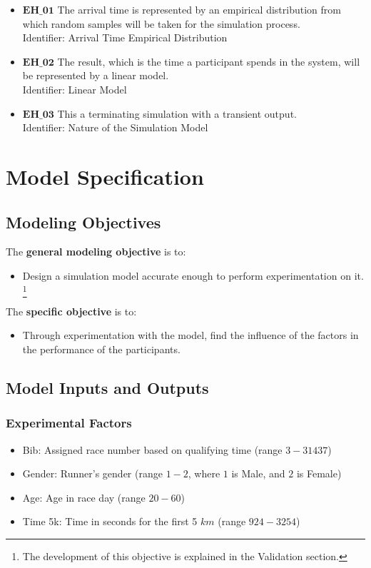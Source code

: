 \documentclass[11pt, oneside]{article}   	%
\begin{document}
\begin{itemize}
\item $\textbf{EH\_01}$ The arrival time is represented by an empirical distribution from which random samples will be taken for the simulation process.\\
Identifier: Arrival Time Empirical Distribution
\item $\textbf{EH\_02}$ The result, which is the time a participant spends in the system, will be represented by a linear model.\\
Identifier: Linear Model
\item $\textbf{EH\_03}$ This a terminating simulation with a transient output.\\
Identifier: Nature of the Simulation Model
\end{itemize}

\section{Model Specification}

\subsection{Modeling Objectives}

\hspace{\parindent}The \textbf{general modeling objective} is to:
\begin{itemize}
\item Design a simulation model accurate enough to perform experimentation on it. 
\footnote{The development of this objective is explained in the Validation section.}
\end{itemize}

The \textbf{specific objective} is to:
\begin{itemize}
\item Through experimentation with the model, find the influence of the factors in the performance of the participants. 
\end{itemize}

\subsection{Model Inputs and Outputs}
\subsubsection{Experimental Factors}

\begin{itemize}
\item Bib: Assigned race number based on qualifying time (range $3 - 31437$)
\item Gender: Runner's gender (range $1 - 2$, where $1$ is Male, and $2$ is Female)
\item Age: Age in race day (range $20 - 60$)
\item Time 5k: Time in seconds for the first 5 $km$ (range $924 - 3254$)
\end{itemize}
\end{document}
